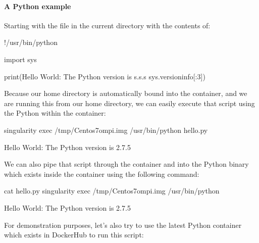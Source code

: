 \documentclass[letterpaper,10pt,english]{sphinxmanual}
\begin{document}
\paragraph{A Python example}
\label{\detokenize{appendix:a-python-example}}
Starting with the file  in the current directory with the contents of:

%
\begin{sphinxVerbatim}[commandchars=\\\{\}]
\PYGZsh{}!/usr/bin/python


import sys

print(\PYGZdq{}Hello World: The Python version is \PYGZpc{}s.\PYGZpc{}s.\PYGZpc{}s\PYGZdq{} \PYGZpc{} sys.version\PYGZus{}info[:3])
\end{sphinxVerbatim}

Because our home directory is automatically bound into the container,
and we are running this from our home directory, we can easily execute
that script using the Python within the container:

%
\begin{sphinxVerbatim}[commandchars=\\\{\}]
\PYGZdl{} singularity exec /tmp/Centos7\PYGZhy{}ompi.img /usr/bin/python hello.py

Hello World: The Python version is 2.7.5
\end{sphinxVerbatim}

We can also pipe that script through the container and into the Python
binary which exists inside the container using the following command:

%
\begin{sphinxVerbatim}[commandchars=\\\{\}]
\PYGZdl{} cat hello.py \textbar{} singularity exec /tmp/Centos7\PYGZhy{}ompi.img /usr/bin/python

Hello World: The Python version is 2.7.5
\end{sphinxVerbatim}

For demonstration purposes, let’s also try to use the latest Python
container which exists in DockerHub to run this script:
\end{document}

